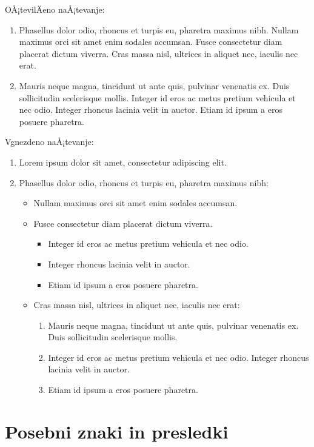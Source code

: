 \documentclass[a4paper]{article}
\begin{document}
OÅ¡tevilÄeno naÅ¡tevanje:
%
\begin{enumerate}

\item Phasellus dolor odio, rhoncus et turpis eu, pharetra maximus nibh. Nullam maximus
  orci sit amet enim sodales accumsan. Fusce consectetur diam placerat dictum viverra.
  Cras massa nisl, ultrices in aliquet nec, iaculis nec erat.

\item Mauris neque magna, tincidunt ut ante quis, pulvinar venenatis ex. Duis sollicitudin
  scelerisque mollis. Integer id eros ac metus pretium vehicula et nec odio. Integer
  rhoncus lacinia velit in auctor. Etiam id ipsum a eros posuere pharetra.
\end{enumerate}

Vgnezdeno naÅ¡tevanje:
%
\begin{enumerate}
\item Lorem ipsum dolor sit amet, consectetur adipiscing elit.
\item Phasellus dolor odio, rhoncus et turpis eu, pharetra maximus nibh:
  \begin{itemize}
  \item Nullam maximus orci sit amet enim sodales accumsan.
  \item Fusce consectetur diam placerat dictum viverra.
    \begin{itemize}
    \item Integer id eros ac metus pretium vehicula et nec odio.
    \item Integer rhoncus lacinia velit in auctor.
    \item Etiam id ipsum a eros posuere pharetra.
    \end{itemize}
  \item Cras massa nisl, ultrices in aliquet nec, iaculis nec erat:
    \begin{enumerate}
    \item Mauris neque magna, tincidunt ut ante quis, pulvinar venenatis ex. Duis
      sollicitudin scelerisque mollis.
    \item Integer id eros ac metus pretium vehicula et nec odio. Integer rhoncus lacinia
      velit in auctor.
    \item Etiam id ipsum a eros posuere pharetra.
    \end{enumerate}
  \end{itemize}
\end{enumerate}

\section{Posebni znaki in presledki}
\end{document}
